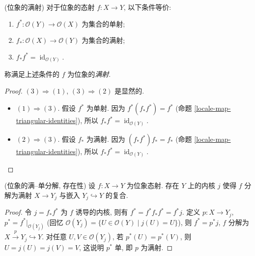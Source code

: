 \begin{propdef}
	[label={surjection-of-locales}]
	{(位象的满射)}
	对于位象的态射 $f\colon X\to Y$, 以下条件等价:
	\begin{enumerate}[(1)]
		\item $f^*\colon \mathcal O(Y)\to\mathcal O(X)$ 为集合的单射;
		\item $f_*\colon \mathcal O(X)\to\mathcal O(Y)$ 为集合的满射;
		\item $f_*f^* = \operatorname{id}_{\mathcal O(Y)}$.
	\end{enumerate}
	称满足上述条件的 $f$ 为位象的\emph{满射}.
\end{propdef}
\begin{proof}
	$(3)\Rightarrow (1)$, $(3)\Rightarrow (2)$ 是显然的.
	\begin{itemize}
		\item $(1)\Rightarrow (3)$. 假设 $f^*$ 为单射. 因为 $f^*(f_*f^*) = f^*$ (命题 \ref{locale-map-triangular-identities}), 所以 $f_*f^*=\operatorname{id}_{\mathcal O(Y)}$.
		\item $(2)\Rightarrow (3)$. 假设 $f_*$ 为满射. 因为 $(f_*f^*)f_* = f_*$ (命题 \ref{locale-map-triangular-identities}), 所以 $f_*f^*=\operatorname{id}_{\mathcal O(Y)}$.
	\end{itemize}
\end{proof}

\begin{prop}
	[label={locale-epi-mono-decomposition-existence}]
	{(位象的满--单分解, 存在性)}
	设 $f\colon X\to Y$ 为位象态射.
	存在 $Y$ 上的内核 $j$ 使得 $f$ 分解为满射 $X\to Y_j$ 与嵌入 $Y_j\hookrightarrow Y$ 的复合.
\end{prop}
\begin{proof}
	令 $j = f_*f^*$ 为 $f$ 诱导的内核, 则有 $f^* = f^*f_*f^* = f^*j$.
	定义 $p\colon X\to Y_j$, $p^* = f^*\big|_{\mathcal O(Y_j)}$ (回忆 $\mathcal O(Y_j) = \{U\in\mathcal O(Y)\mid j(U)=U\}$),
	则 $f^*=p^*j$, $f$ 分解为 $X\overset{p}{\to} Y_j \hookrightarrow Y$.
	对任意 $U,V\in\mathcal O(Y_j)$, 若 $p^*(U)=p^*(V)$, 则 $U=j(U)=j(V)=V$, 这说明 $p^*$ 单, 即 $p$ 为满射.
\end{proof}

